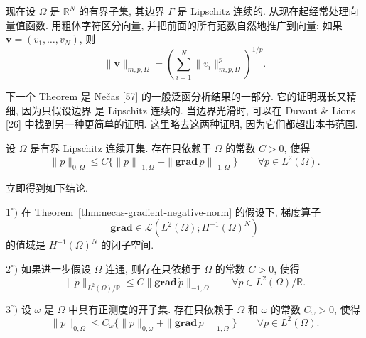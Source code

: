 现在设 $\Omega$ 是 $\mathbb R^N$ 的有界子集, 其边界 $\Gamma$ 是 Lipschitz 连续的.
从现在起经常处理向量值函数. 用粗体字符区分向量, 并把前面的所有范数自然地推广到向量:
如果 $\mathbf v=(v_1,\ldots,v_N)$, 则
\[
\|\mathbf v\|_{m,p,\Omega}=\left(\sum_{i=1}^N\|v_i\|_{m,p,\Omega}^p\right)^{1/p}.
\]

下一个 Theorem 是 Nečas [57] 的一般泛函分析结果的一部分. 它的证明既长又精细, 因为只假设边界
是 Lipschitz 连续的. 当边界光滑时, 可以在 Duvaut \& Lions [26] 中找到另一种更简单的证明.
这里略去这两种证明, 因为它们都超出本书范围.

\setcounter{statement}{1}
\renewcommand{\theHstatement}{theorem.\thesection.\arabic{statement}}
\begin{Theorem}\label{thm:necas-gradient-negative-norm}
设 $\Omega$ 是有界 Lipschitz 连续开集. 存在只依赖于 $\Omega$ 的常数 $C>0$, 使得
\begin{equation}\label{eq:necas-gradient-negative-norm}
\|p\|_{0,\Omega}\leq C\{\|p\|_{-1,\Omega}+\|\mathbf{grad}\,p\|_{-1,\Omega}\}
\qquad\forall p\in L^2(\Omega).
\end{equation}
\end{Theorem}

立即得到如下结论.

\setcounter{statement}{0}
\renewcommand{\theHstatement}{corollary.\thesection.\arabic{statement}}
\begin{Corollary}\label{cor:gradient-closed-range-quotient-local}
$1^\circ)$ 在 Theorem~\ref{thm:necas-gradient-negative-norm} 的假设下, 梯度算子
\[
\mathbf{grad}\in\mathcal L(L^2(\Omega);H^{-1}(\Omega)^N)
\]
的值域是 $H^{-1}(\Omega)^N$ 的闭子空间.

$2^\circ)$ 如果进一步假设 $\Omega$ 连通, 则存在只依赖于 $\Omega$ 的常数 $C>0$, 使得
\begin{equation}\label{eq:gradient-quotient-negative-norm}
\|\dot p\|_{L^2(\Omega)/\mathbb R}\leq C\|\mathbf{grad}\,\dot p\|_{-1,\Omega}
\qquad\forall\dot p\in L^2(\Omega)/\mathbb R.
\end{equation}

$3^\circ)$ 设 $\omega$ 是 $\Omega$ 中具有正测度的开子集. 存在只依赖于 $\Omega$ 和 $\omega$ 的常数
$C_\omega>0$, 使得
\begin{equation}\label{eq:gradient-local-control}
\|p\|_{0,\Omega}\leq C_\omega\{\|p\|_{0,\omega}+\|\mathbf{grad}\,p\|_{-1,\Omega}\}
\qquad\forall p\in L^2(\Omega).
\end{equation}
\end{Corollary}

